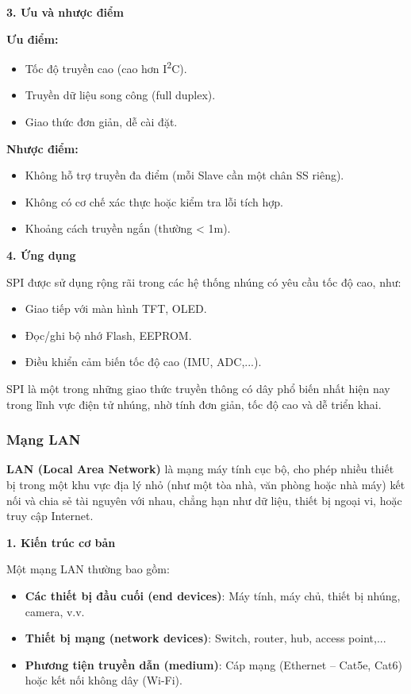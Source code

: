 \textbf{3. Ưu và nhược điểm}

\textbf{Ưu điểm:}
\begin{itemize}
    \item Tốc độ truyền cao (cao hơn I\textsuperscript{2}C).
    \item Truyền dữ liệu song công (full duplex).
    \item Giao thức đơn giản, dễ cài đặt.
\end{itemize}

\textbf{Nhược điểm:}
\begin{itemize}
    \item Không hỗ trợ truyền đa điểm (mỗi Slave cần một chân SS riêng).
    \item Không có cơ chế xác thực hoặc kiểm tra lỗi tích hợp.
    \item Khoảng cách truyền ngắn (thường < 1m).
\end{itemize}

\textbf{4. Ứng dụng}

SPI được sử dụng rộng rãi trong các hệ thống nhúng có yêu cầu tốc độ cao, như:
\begin{itemize}
    \item Giao tiếp với màn hình TFT, OLED.
    \item Đọc/ghi bộ nhớ Flash, EEPROM.
    \item Điều khiển cảm biến tốc độ cao (IMU, ADC,...).
\end{itemize}

SPI là một trong những giao thức truyền thông có dây phổ biến nhất hiện nay trong lĩnh vực điện tử nhúng, nhờ tính đơn giản, tốc độ cao và dễ triển khai.

\FloatBarrier
\subsubsection{Mạng LAN}

\textbf{LAN (Local Area Network)\cite{cloudflare_lan}} là mạng máy tính cục bộ, cho phép nhiều thiết bị trong một khu vực địa lý nhỏ (như một tòa nhà, văn phòng hoặc nhà máy) kết nối và chia sẻ tài nguyên với nhau, chẳng hạn như dữ liệu, thiết bị ngoại vi, hoặc truy cập Internet.

\textbf{1. Kiến trúc cơ bản}

Một mạng LAN thường bao gồm:

\begin{itemize}
    \item \textbf{Các thiết bị đầu cuối (end devices)}: Máy tính, máy chủ, thiết bị nhúng, camera, v.v.
    \item \textbf{Thiết bị mạng (network devices)}: Switch, router, hub, access point,...
    \item \textbf{Phương tiện truyền dẫn (medium)}: Cáp mạng (Ethernet – Cat5e, Cat6) hoặc kết nối không dây (Wi-Fi).
\end{itemize}


